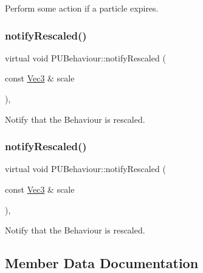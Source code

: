 Perform some action if a particle expires. \mbox{\label{classPUBehaviour_ae2544d7f4a7a98e06c5ea9cedd1085ab}} 
\subsubsection{\texorpdfstring{notify\+Rescaled()}{notifyRescaled()}\hspace{0.1cm}{\footnotesize\ttfamily [1/2]}}
{\footnotesize\ttfamily virtual void P\+U\+Behaviour\+::notify\+Rescaled (\begin{DoxyParamCaption}\item[{const \hyperlink{classVec3}{Vec3} \&}]{scale }\end{DoxyParamCaption})\hspace{0.3cm}{\ttfamily [inline]}, {\ttfamily [virtual]}}

Notify that the Behaviour is rescaled. \mbox{\label{classPUBehaviour_ae2544d7f4a7a98e06c5ea9cedd1085ab}} 
\subsubsection{\texorpdfstring{notify\+Rescaled()}{notifyRescaled()}\hspace{0.1cm}{\footnotesize\ttfamily [2/2]}}
{\footnotesize\ttfamily virtual void P\+U\+Behaviour\+::notify\+Rescaled (\begin{DoxyParamCaption}\item[{const \hyperlink{classVec3}{Vec3} \&}]{scale }\end{DoxyParamCaption})\hspace{0.3cm}{\ttfamily [inline]}, {\ttfamily [virtual]}}

Notify that the Behaviour is rescaled. 

\subsection{Member Data Documentation}
\mbox{\label{classPUBehaviour_a50b0f3e7c92ea57a66c1727c0b487300}} 
